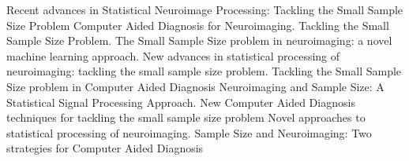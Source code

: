 





Recent advances in Statistical Neuroimage Processing: Tackling the Small Sample Size Problem
Computer Aided Diagnosis for Neuroimaging. Tackling the Small Sample Size Problem.
The Small Sample Size problem in neuroimaging: a novel machine learning approach.
New advances in statistical processing of neuroimaging: tackling the small sample size problem. 
Tackling the Small Sample Size problem in Computer Aided Diagnosis
Neuroimaging and Sample Size: A Statistical Signal Processing Approach.
New Computer Aided Diagnosis techniques for tackling the small sample size problem
Novel approaches to statistical processing of neuroimaging.
Sample Size and Neuroimaging: Two strategies for Computer Aided Diagnosis